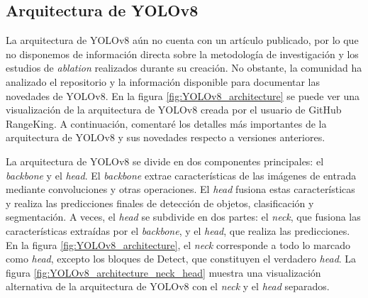 \subsection{Arquitectura de YOLOv8}
La arquitectura de YOLOv8 aún no cuenta con un artículo publicado, por lo que no disponemos de información directa sobre la metodología de investigación y los estudios de \textit{ablation} realizados durante su creación. No obstante, la comunidad ha analizado el repositorio y la información disponible para documentar las novedades de YOLOv8. En la figura \ref{fig:YOLOv8_architecture} se puede ver una visualización de la arquitectura de YOLOv8 creada por el usuario de GitHub RangeKing\cite{RangeKing_GitHub}. A continuación, comentaré los detalles más importantes de la arquitectura de YOLOv8 y sus novedades respecto a versiones anteriores. \cite{whats-new-in-yolov8} \cite{yolov8-architecture-blog} \cite{yolov8-architecture-blog2}

La arquitectura de YOLOv8 se divide en dos componentes principales: el \textit{backbone} y el \textit{head}. El \textit{backbone} extrae características de las imágenes de entrada mediante convoluciones y otras operaciones. El \textit{head} fusiona estas características y realiza las predicciones finales de detección de objetos, clasificación y segmentación. A veces, el \textit{head} se subdivide en dos partes: el \textit{neck}, que fusiona las características extraídas por el \textit{backbone}, y el \textit{head}, que realiza las predicciones. En la figura \ref{fig:YOLOv8_architecture}, el \textit{neck} corresponde a todo lo marcado como \textit{head}, excepto los bloques de Detect, que constituyen el verdadero \textit{head}. La figura \ref{fig:YOLOv8_architecture_neck_head} muestra una visualización alternativa de la arquitectura de YOLOv8 con el \textit{neck} y el \textit{head} separados.

